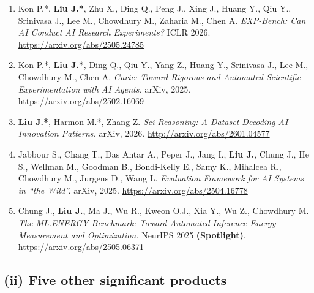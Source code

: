 \documentclass[10pt]{article}
\begin{document}
{\small
\begin{enumerate}[noitemsep, topsep=2pt, leftmargin=1.5em, label=\arabic*.]

  \item Kon P.*, \textbf{Liu J.*}, Zhu X., Ding Q., Peng J., Xing J., Huang Y., Qiu Y., Srinivasa J., Lee M.,
        Chowdhury M., Zaharia M., Chen A.
        \textit{EXP-Bench: Can AI Conduct AI Research Experiments?}
        ICLR 2026. \url{https://arxiv.org/abs/2505.24785}

  \item Kon P.*, \textbf{Liu J.*}, Ding Q., Qiu Y., Yang Z., Huang Y., Srinivasa J., Lee M., Chowdhury M., Chen A.
        \textit{Curie: Toward Rigorous and Automated Scientific Experimentation with AI Agents.}
        arXiv, 2025. \url{https://arxiv.org/abs/2502.16069}

  \item \textbf{Liu J.*}, Harmon M.*, Zhang Z.
        \textit{Sci-Reasoning: A Dataset Decoding AI Innovation Patterns.}
        arXiv, 2026. \url{http://arxiv.org/abs/2601.04577}

  \item Jabbour S., Chang T., Das Antar A., Peper J., Jang I., \textbf{Liu J.}, Chung J., He S., Wellman M.,
        Goodman B., Bondi-Kelly E., Samy K., Mihalcea R., Chowdhury M., Jurgens D., Wang L.
        \textit{Evaluation Framework for AI Systems in ``the Wild''.}
        arXiv, 2025. \url{https://arxiv.org/abs/2504.16778}

  \item Chung J., \textbf{Liu J.}, Ma J., Wu R., Kweon O.J., Xia Y., Wu Z., Chowdhury M.
        \textit{The ML.ENERGY Benchmark: Toward Automated Inference Energy Measurement and Optimization.}
        NeurIPS 2025 \textbf{(Spotlight)}. \url{https://arxiv.org/abs/2505.06371}

\end{enumerate}
}

\subsection*{(ii) Five other significant products}
\end{document}
